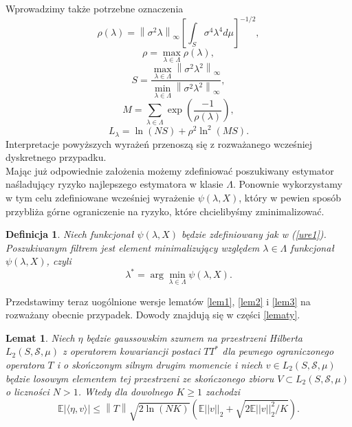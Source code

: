 \documentclass{mwart}
\newtheorem{df}{Definicja}
\newtheorem{lm}{Lemat}
\newcommand{\norm}[1]{\left\lVert#1\right\rVert}
\begin{document}
Wprowadzimy także potrzebne oznaczenia
\begin{displaymath}
\rho(\lambda)=\norm{\sigma^2\lambda}_{\infty}\left[\int_S\sigma^4\lambda^4d\mu\right]^{-1/2},
\end{displaymath}
\begin{displaymath}
\rho=\max_{\lambda\in \Lambda}\rho(\lambda),
\end{displaymath}
\begin{displaymath}
S=\frac{\max_{\lambda\in\Lambda}\norm{\sigma^2\lambda^2}_{\infty}}{\min_{\lambda\in \Lambda}\norm{\sigma^2\lambda^2}_{\infty}},
\end{displaymath}
\begin{displaymath}
M=\sum_{\lambda\in \Lambda}\exp\left(\frac{-1}{\rho(\lambda)}\right),
\end{displaymath}
\begin{displaymath}
L_{\lambda}=\ln(NS)+\rho^2\ln^2(MS).
\end{displaymath}
Interpretacje powyższych wyrażeń przenoszą się z rozważanego wcześniej dyskretnego przypadku.\\
Mając już odpowiednie założenia możemy zdefiniować poszukiwany estymator naśladujący ryzyko najlepszego estymatora w klasie $\Lambda$. Ponownie wykorzystamy w tym celu zdefiniowane wcześniej wyrażenie $\psi(\lambda,X)$, który w pewien sposób przybliża górne ograniczenie na  ryzyko, które chcielibyśmy zminimalizować.
\begin{df}
Niech funkcjonał $\psi(\lambda,X)$ będzie zdefiniowany jak w (\ref{ure1}). Poszukiwanym filtrem jest element minimalizujący względem $\lambda\in \Lambda$ funkcjonał $\psi(\lambda,X)$, czyli
\begin{equation}\label{estimator1}
\lambda^*=\arg\min_{\lambda\in \Lambda}\psi(\lambda,X).
\end{equation}
\end{df}
Przedstawimy teraz uogólnione wersje lematów \ref{lem1}, \ref{lem2} i \ref{lem3} na rozważany obecnie przypadek. Dowody znajdują się w części \ref{lematy}.
\begin{lm}\label{lem4}
Niech $\eta$ będzie gaussowskim szumem na przestrzeni Hilberta $L_2(S,\mathcal{S},\mu)$ z operatorem kowariancji postaci $TT^*$ dla pewnego ograniczonego operatora $T$ i o skończonym silnym drugim momencie i niech $v\in L_2(S,\mathcal{S},\mu)$ będzie losowym elementem tej przestrzeni ze skończonego zbioru $V\subset L_2(S,\mathcal{S},\mu)$ o liczności $N>1$. Wtedy dla dowolnego $K\geq 1$ zachodzi
\begin{displaymath}
\mathbb{E}\left|\langle \eta, v\rangle\right|\leq \norm{T} \sqrt{2\ln (NK)}\left(\mathbb{E}||v||_2+\sqrt{2\mathbb{E}||v||_2^2/K}\right).
\end{displaymath}
\end{lm}
\end{document}
